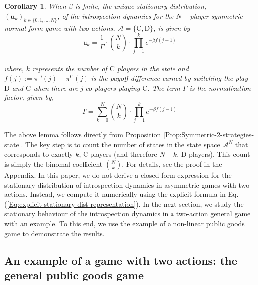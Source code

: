 \documentclass[11pt]{article}
\theoremstyle{plainCl1}
\theoremstyle{plainCl2}
\newtheorem{Corollary}{Corollary}
\newcommand{\ubf}{\mathbf{u}}
\newcommand{\C}{\mathrm{C}}
\newcommand{\D}{\mathrm{D}}
\begin{document}
\begin{Corollary}
\label{Lemma: Symmetric-2-stg}
When $\beta$ is finite, the unique stationary distribution, $(\ubf_k)_{k \in \{0,1,...,N\}}$, of the introspection dynamics for the $N-$player symmetric normal form game with two actions, $\mathcal{A} = \{\C, \D \}$, is given by \\
\begin{equation}
\label{Eq:stationary-dist-symm-2-stgs}
\ubf_k = \frac{1}{\Gamma} \cdot {N \choose k} \cdot \displaystyle \prod_{j=1}^{k} \displaystyle e^{-\beta f(j-1)}
\end{equation} \\ 
where, $k$ represents the number of $\C$ players in the state and $f(j) := \pi^\D(j) - \pi^\C(j)$ is the payoff difference earned by switching the play $\D$ and $\C$ when there are $j$ co-players playing $\C$. The term $\Gamma$ is the normalization factor, given by, \\
\begin{equation}
\label{Eq:normalization-Tk}
\Gamma = \displaystyle \sum_{k=0}^N {N \choose k} \cdot \displaystyle \prod_{j=1}^{k} \displaystyle e^{-\beta f(j-1)}
\end{equation}
\end{Corollary}
\noindent The above lemma follows directly from Proposition \ref{Prop:Symmetric-2-strategies-state}. The key step is to count the number of states in the state space $\mathcal{A}^N$ that corresponds to exactly $k$, $\C$ players (and therefore $N-k$, $\D$ players). This count is simply the binomal coefficient $N \choose k$. For details, see the proof in the Appendix. In this paper, we do not derive a closed form expression for the stationary distribution of introspection dynamics in asymmetric games with two actions. Instead, we compute it numerically using the explicit formula in Eq. (\ref{Eq:explicit-stationary-dist-representation}). In the next section, we study the stationary behaviour of the introspection dynamics in a two-action general game with an example. To this end, we use the example of a non-linear public goods game to demonstrate the results. 

\subsection*{An example of a  game with two actions: the general public goods game}
\end{document}
